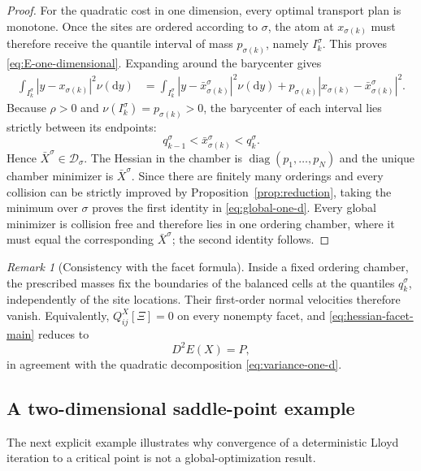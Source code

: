 \documentclass[11pt]{article}
\def\Dc{{\mathcal D}}
\newcommand{\dd}{\mathrm{d}}
\theoremstyle{definition}
\theoremstyle{remark}
\newtheorem{remark}[theorem]{Remark}
\numberwithin{equation}{section}
\begin{document}
\begin{proof}
For the quadratic cost in one dimension, every optimal transport plan is monotone.  Once the sites
are ordered according to $\sigma$, the atom at $x_{\sigma(k)}$ must therefore receive the quantile
interval of mass $p_{\sigma(k)}$, namely $I_k^\sigma$.  This proves
\eqref{eq:E-one-dimensional}.  Expanding around the barycenter gives
\begin{align}\label{eq:variance-one-d}
 \int_{I_k^\sigma}|y-x_{\sigma(k)}|^2\nu(\dd y)
 &={}
 \int_{I_k^\sigma}|y-\bar x_{\sigma(k)}^\sigma|^2\nu(\dd y)
 +p_{\sigma(k)}|x_{\sigma(k)}-\bar x_{\sigma(k)}^\sigma|^2.
\end{align}
Because $\rho>0$ and $\nu(I_k^\sigma)=p_{\sigma(k)}>0$, the barycenter of each interval lies
strictly between its endpoints:
\[
 q_{k-1}^\sigma<\bar x_{\sigma(k)}^\sigma<q_k^\sigma.
\]
Hence $\bar X^\sigma\in\Dc_\sigma$.  The Hessian in the chamber is
$\operatorname{diag}(p_1,\ldots,p_N)$ and the unique chamber minimizer is
$\bar X^\sigma$.  Since there are finitely many orderings and every collision can be strictly
improved by Proposition~\ref{prop:reduction}, taking the minimum over $\sigma$ proves the first
identity in \eqref{eq:global-one-d}.  Every global minimizer is collision free and therefore lies
in one ordering chamber, where it must equal the corresponding $\bar X^\sigma$; the second identity
follows.
\end{proof}

\begin{remark}[Consistency with the facet formula]\label{rem:one-dimensional-Hessian}
Inside a fixed ordering chamber, the prescribed masses fix the boundaries of the balanced cells at
the quantiles $q_k^\sigma$, independently of the site locations.  Their first-order normal velocities
therefore vanish.  Equivalently, $Q_{ij}^X[\Xi]=0$ on every nonempty facet, and
\eqref{eq:hessian-facet-main} reduces to
\[
 D^2E(X)=P,
\]
in agreement with the quadratic decomposition \eqref{eq:variance-one-d}.
\end{remark}

\subsection{A two-dimensional saddle-point example}

The next explicit example illustrates why convergence of a deterministic Lloyd iteration to a
critical point is not a global-optimization result.
\end{document}

